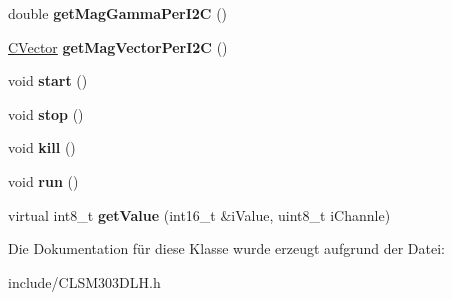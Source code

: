 \begin{DoxyCompactItemize}
\item 
\hypertarget{class_c_l_s_m303_d_l_h_a2155291a89ad187bb2e1c1ca347d925f}{double {\bfseries get\-Mag\-Gamma\-Per\-I2\-C} ()}\label{class_c_l_s_m303_d_l_h_a2155291a89ad187bb2e1c1ca347d925f}

\item 
\hypertarget{class_c_l_s_m303_d_l_h_a3ed857be8913e6f5beda82a3cfefe1d2}{\hyperlink{class_c_vector}{\-C\-Vector} {\bfseries get\-Mag\-Vector\-Per\-I2\-C} ()}\label{class_c_l_s_m303_d_l_h_a3ed857be8913e6f5beda82a3cfefe1d2}

\item 
\hypertarget{class_c_l_s_m303_d_l_h_a847e9a0faff128c259f91ecdc4c47745}{void {\bfseries start} ()}\label{class_c_l_s_m303_d_l_h_a847e9a0faff128c259f91ecdc4c47745}

\item 
\hypertarget{class_c_l_s_m303_d_l_h_af5947cac08ab6246a93c73a8d45334de}{void {\bfseries stop} ()}\label{class_c_l_s_m303_d_l_h_af5947cac08ab6246a93c73a8d45334de}

\item 
\hypertarget{class_c_l_s_m303_d_l_h_ac9ea19f2def71b8605cf0fa9a554e7fe}{void {\bfseries kill} ()}\label{class_c_l_s_m303_d_l_h_ac9ea19f2def71b8605cf0fa9a554e7fe}

\item 
\hypertarget{class_c_l_s_m303_d_l_h_acab2194faf7332d8209e30a0fb397288}{void {\bfseries run} ()}\label{class_c_l_s_m303_d_l_h_acab2194faf7332d8209e30a0fb397288}

\item 
\hypertarget{class_c_l_s_m303_d_l_h_a58a58643906cee882a3e77ec9e733032}{virtual int8\-\_\-t {\bfseries get\-Value} (int16\-\_\-t \&i\-Value, uint8\-\_\-t i\-Channle)}\label{class_c_l_s_m303_d_l_h_a58a58643906cee882a3e77ec9e733032}

\end{DoxyCompactItemize}


\-Die \-Dokumentation für diese \-Klasse wurde erzeugt aufgrund der \-Datei\-:\begin{DoxyCompactItemize}
\item 
include/\-C\-L\-S\-M303\-D\-L\-H.\-h\end{DoxyCompactItemize}
